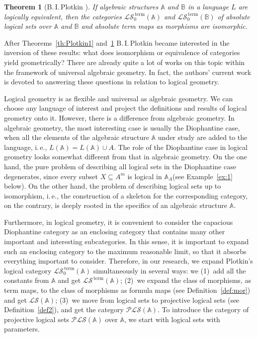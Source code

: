 \documentclass[12pt]{article}
\newtheorem{theorem}{Theorem}
\theoremstyle{definition}
\def\MA{{\mathbb{A}}}
\def\MB{{\mathbb{B}}}
\def\PLS{{\mathcal{PLS}}}
\def\LS{{\mathcal{LS}}}
\def\term{{\,\mathrm{term}}}
\begin{document}
\begin{theorem}[B.\,I.\,Plotkin \cite{Plotkin6}]\label{th:Plotkin2}
If algebraic structures $\MA$ and $\MB$ in a language $L$ are logically equivalent, then the categories $\LS^\term_0(\MA)$ and $\LS^\term_0(\MB)$ of absolute logical sets over $\MA$ and $\MB$ and absolute term maps as morphisms are isomorphic.
\end{theorem}

After Theorems~\ref{th:Plotkin1} and~\ref{th:Plotkin2} B.\,I.\,Plotkin became interested in the inversion of these results: what does isomorphism or equivalence of categories yield geometrically? There are already quite a lot of works on this topic within the framework of universal algebraic geometry.
 In fact, the authors' current work is devoted to answering these questions in relation to logical geometry.

Logical geometry is as flexible and universal as algebraic geometry. We can choose any language of interest and project the definitions and results of logical geometry onto it. However, there is a difference from algebraic geometry. In algebraic geometry, the most interesting case is usually the Diophantine case, when all the elements of the algebraic structure $\MA$ under study are added to the language, i.\,e., $L(\MA)=L(\MA)\cup A$. The role of the Diophantine case in logical geometry looks somewhat different from that in algebraic geometry. On the one hand, the pure problem of describing all logical sets in the Diophantine case degenerates, since every subset $X\subseteq A^m$ is logical in $\MA_A$(see Example~\ref{ex:1} below). On the other hand, the problem of describing logical sets up to isomorphism, i.\,e., the construction of a skeleton for the corresponding category, on the contrary, is deeply rooted in the specifics of an algebraic structure $\MA$. 

Furthermore, in logical geometry, it is convenient to consider the capacious Diophantine category as an enclosing category that contains many other important and interesting subcategories. In this sense, it is important to expand such an enclosing category to the maximum reasonable limit, so that it absorbs everything important to consider. Therefore, in our research, we expand Plotkin's logical category $\LS_0^\term(\MA)$ simultaneously in several ways: we (1)~add all the constants from $\MA$ and get $\LS^\term(\MA)$; (2)~we expand the class of morphisms, as term maps, to the class of morphisms as formula maps (see Definition~\ref{def:mor}) and get $\LS(\MA)$; (3)~we move from logical sets to projective logical sets (see Definition~\ref{def2}), and get the category $\PLS(\MA)$. To introduce the category of projective logical sets $\PLS(\MA)$ over $\MA$, we start with logical sets with parameters.
 
\end{document}
